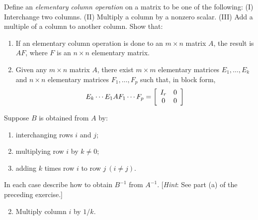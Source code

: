 \begin{multicols}{2}
\begin{ex}
Define an \textit{elementary column operation} on a matrix to be one of the following: (I) Interchange two columns. (II) Multiply a column by a nonzero scalar. (III) Add a multiple of a column to another column. Show that:

\begin{enumerate}[label={\alph*.}]
\item If an elementary column operation is done to an $m \times n$ matrix $A$, the result is $AF$, where $F$ is an $n \times n$ elementary matrix.

\item Given any $m \times n$ matrix $A$, there exist $m \times m$ elementary matrices $E_{1}, \dots, E_{k}$ and $n \times n$ elementary matrices $F_{1}, \dots, F_{p}$ such that, in block form,
\begin{equation*}
E_{k} \cdots E_{1}AF_{1} \cdots F_{p} = \left[ \begin{array}{cc}
I_{r} & 0 \\
0 & 0
\end{array} \right]
\end{equation*}
\end{enumerate}
\end{ex}

\begin{ex}
Suppose $B$ is obtained from $A$ by:

\begin{enumerate}[label={\alph*.}]
\item interchanging rows $i$ and $j$;

\item multiplying row $i$ by $k \neq 0$;

\item adding $k$ times row $i$ to row $j\ (i \neq j)$.

\end{enumerate}

In each case describe how to obtain $B^{-1}$ from $A^{-1}$. [\textit{Hint}: See part (a) of the preceding exercise.]

\begin{sol}
\begin{enumerate}[label={\alph*.}]
\setcounter{enumi}{1}
\item  Multiply column $i$ by $1/k$.

\end{enumerate}
\end{sol}
\end{ex}


\end{multicols}
